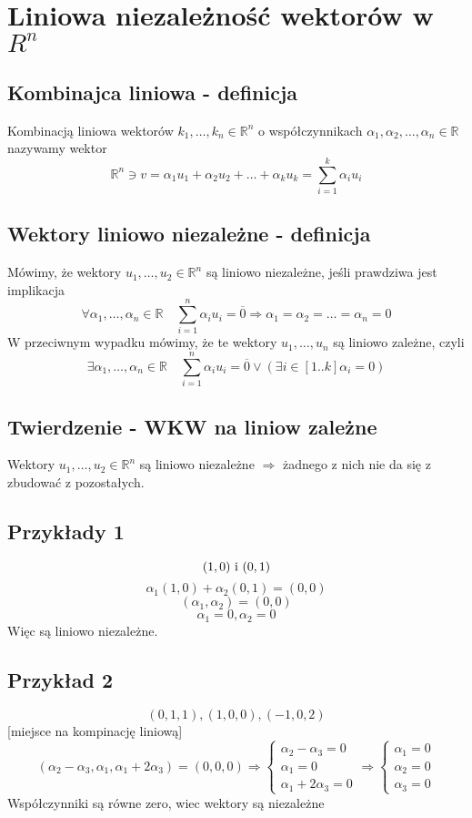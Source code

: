 \documentclass[11pt]{article}
\begin{document}
\section{Liniowa niezależność wektorów w $R^n$}

\subsection{Kombinajca liniowa - definicja}
Kombinacją liniowa wektorów $k_1, \ldots, k_n \in \mathbb{R}^n$ o współczynnikach $ \alpha_1,\alpha_2,\ldots,\alpha_n \in \mathbb{R}$ nazywamy wektor
$$\mathbb{R}^n \ni v = \alpha_1 u_1  + \alpha_2 u_2 + \ldots  + \alpha_k u_k = \sum_{i=1}^k{\alpha_i u_i} $$
\subsection{Wektory liniowo niezależne - definicja}
Mówimy, że wektory $u_1,\ldots,u_2 \in \mathbb{R}^n$ są liniowo niezależne, jeśli prawdziwa jest implikacja
$$ \forall \alpha_1,\ldots,\alpha_n \in \mathbb{R} \quad \sum_{i=1}^n \alpha_i u_i = \overline{0} \Longrightarrow \alpha_1 = \alpha_2 = \ldots = \alpha_n = 0$$
W przeciwnym wypadku mówimy, że te wektory $u_1,\ldots,u_n$ są liniowo zależne, czyli
$$ \exists \alpha_1,\ldots,\alpha_n \in \mathbb{R} \quad 
\sum_{i=1}^n \alpha_i u_i = \overline{0} \vee ( \exists i \in [1..k] \alpha_i = 0)$$
\subsection{Twierdzenie - WKW na liniow zależne}
Wektory $u_1,\ldots,u_2 \in \mathbb{R}^n$ są liniowo niezależne $\Longrightarrow$ żadnego z nich nie da się z zbudować z pozostałych.
\subsection{Przykłady 1}
$$(1,0) \hbox{ i } (0,1)$$
$$\alpha_1 (1,0) + \alpha_2 (0,1) = (0,0)$$
$$(\alpha_1,\alpha_2) = (0,0)$$
$$ \alpha_1 = 0, \alpha_2 = 0$$
Więc są liniowo niezależne.
\subsection{Przykład 2}
$$(0,1,1) , (1,0,0) , (-1,0,2)$$
[miejsce na kompinację liniową]
$$(\alpha_2 - \alpha_3,\alpha_1,\alpha_1 + 2\alpha_3) = (0,0,0) \Longrightarrow \begin{cases}\alpha_2 - \alpha_3 = 0 \\ \alpha_1 = 0 \\ \alpha_1 + 2 \alpha_3 = 0 \end{cases} \Longrightarrow \begin{cases}\alpha_1 = 0 \\ \alpha_2 = 0 \\ \alpha_3 = 0 \end{cases}$$
Współczynniki są równe zero, wiec wektory są niezależne
\end{document}
